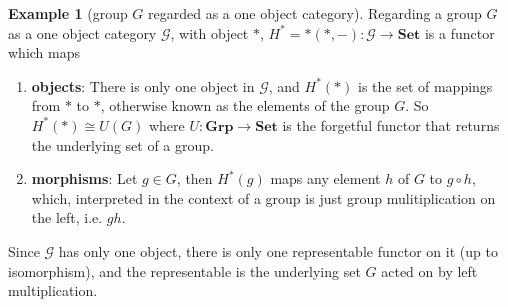 \documentclass[11pt]{article}
\theoremstyle{definition}
\theoremstyle{definition}
\newtheorem{ex}{Example}
\theoremstyle{plain}
\theoremstyle{plain}
\theoremstyle{plain}
\begin{document}
\begin{ex}[group $G$ regarded as a one object category]
Regarding a group $G$ as a one object category $\mathscr{G}$, with object $\ast$, $H^{\ast}=\ast(\ast, -): \mathscr{G} \to \textbf{Set}$ is a functor which maps
\begin{enumerate}
\item \textbf{objects}: There is only one object in $\mathscr{G}$, and $H^{\ast}(\ast)$ is the set of mappings from $\ast$ to $\ast$, otherwise known as the elements of the group $G$. So $H^{\ast}(\ast) \cong U(G)$ where $U:\textbf{Grp} \to \textbf{Set}$ is the forgetful functor that returns the underlying set of a group.
\item \textbf{morphisms}: Let $g \in G$, then $H^{\ast}(g)$ maps any element $h$ of $G$ to $g \circ h$, which, interpreted in the context of a group is just group mulitiplication on the left, i.e. $gh$.
\end{enumerate}

Since $\mathscr{G}$ has only one object, there is only one representable functor on it (up to isomorphism), and the representable is the underlying set $G$ acted on by left multiplication.
\end{ex}
\end{document}
